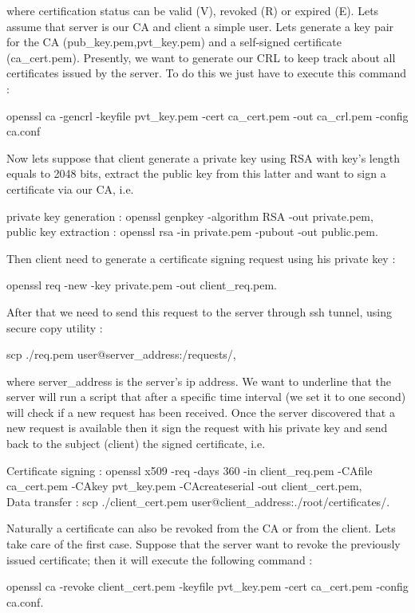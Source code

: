 \documentclass[11pt]{article}
\begin{document}
where certification status can be valid (V), revoked (R) or expired (E). Lets assume that server is our CA and client a simple user. Lets generate a key pair for the CA (pub\_key.pem,pvt\_key.pem) and a self-signed certificate (ca\_cert.pem). Presently, we want to generate our CRL to keep track about all certificates issued by the server. To do this we just have to execute this command : 
\begin{center}
openssl ca -gencrl -keyfile pvt\_key.pem -cert ca\_cert.pem -out ca\_crl.pem -config ca.conf 
\end{center}
Now lets suppose that client generate a private key using RSA with key's length equals to 2048 bits, extract the public key from this latter and want to sign a certificate via our CA, i.e. 
\begin{center}
private key generation : openssl genpkey -algorithm RSA -out private.pem,\\ public key extraction : openssl rsa -in private.pem -pubout -out public.pem.
\end{center}
Then client need to generate a certificate signing request using his private key :
\begin{center}
openssl req -new -key private.pem -out client\_req.pem.
\end{center}
After that we need to send this request to the server through ssh tunnel, using secure copy utility :
\begin{center}
scp ./req.pem user@server\_address:/requests/,
\end{center}
where server\_address is the server's ip address. We want to underline that the server will run a script that after a specific time interval (we set it to one second) will check if a new request has been received. Once the server discovered that a new request is available then it sign the request with his private key and send back to the subject (client) the signed certificate, i.e.
\begin{center}
Certificate signing : openssl x509 -req -days 360 -in client\_req.pem -CAfile ca\_cert.pem -CAkey pvt\_key.pem -CAcreateserial -out client\_cert.pem,\\Data transfer : scp ./client\_cert.pem user@client\_address:./root/certificates/.
\end{center}
Naturally a certificate can also be revoked from the CA or from the client. Lets take care of the first case. Suppose that the server want to revoke the previously issued certificate; then it will execute the following command :
\begin{center}
openssl ca -revoke client\_cert.pem -keyfile pvt\_key.pem -cert ca\_cert.pem -config ca.conf.
\end{center}
\end{document}

